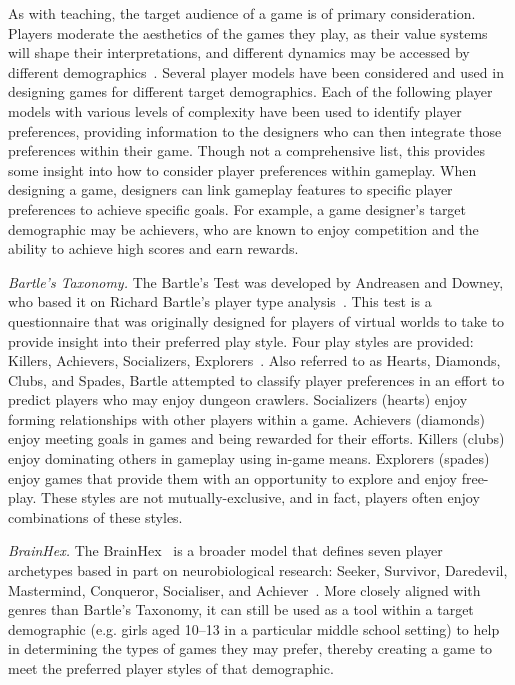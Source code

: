 \documentclass{sig-alternate-05-2015}
\begin{document}
As with teaching, the target audience of a game is of primary consideration. Players moderate the aesthetics of the games they play, as their value systems will shape their interpretations, and different dynamics may be accessed by different demographics~\cite{yee2006motivations, scott2012-monument}. Several player models have been considered and used in designing games for different target demographics. Each of the following player models with various levels of complexity have been used to identify player preferences, providing information to the designers who can then integrate those preferences within their game. Though not a comprehensive list, this provides some insight into how to consider player preferences within gameplay. When designing a game, designers can link gameplay features to specific player preferences to achieve specific goals. For example, a game designer's target demographic may be achievers, who are known to enjoy competition and the ability to achieve high scores and earn rewards. 



{\em Bartle's Taxonomy. }The Bartle's Test was developed by Andreasen and Downey, who based it on Richard Bartle's player type analysis~\cite{bartle2003designing}. This test is a questionnaire that was originally designed for players of virtual worlds to take to provide insight into their preferred play style. Four play styles are provided: Killers, Achievers, Socializers, Explorers~\cite{bartle1996hearts}. Also referred to as Hearts, Diamonds, Clubs, and Spades, Bartle attempted to classify player preferences in an effort to predict players who may enjoy dungeon crawlers. Socializers (hearts) enjoy forming relationships with other players within a game. Achievers (diamonds) enjoy meeting goals in games and being rewarded for their efforts. Killers (clubs) enjoy dominating others in gameplay using in-game means. Explorers (spades) enjoy games that provide them with an opportunity to explore and enjoy free-play. These styles are not mutually-exclusive, and in fact, players often enjoy combinations of these styles.



{\em BrainHex.} The BrainHex~\cite{brainhex} is a broader model that defines seven player archetypes based in part on neurobiological research: Seeker, Survivor, Daredevil, Mastermind, Conqueror, Socialiser, and Achiever~\cite{nacke14}. More closely aligned with genres than Bartle's Taxonomy, it can still be used as a tool within a target demographic (e.g. girls aged 10--13 in a particular middle school setting) to help in determining the types of games they may prefer, thereby creating a game to meet the preferred player styles of that demographic.
\end{document}
